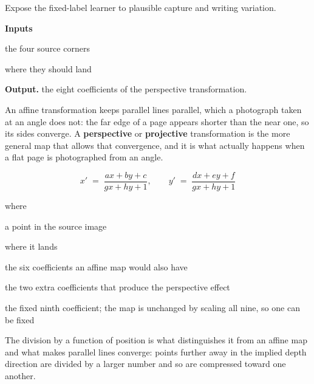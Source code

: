 Expose the fixed-label learner to plausible capture and writing variation.




\noindent\textbf{Inputs}
\begin{description}[leftmargin=2.2em,style=nextline,font=\normalfont\ttfamily]\setlength\itemsep{1pt}
  \item[{startpoints}] \normalfont the four source corners
  \item[{endpoints}] \normalfont where they should land
\end{description}

\noindent\textbf{Output.} the eight coefficients of the perspective transformation.


An affine transformation keeps parallel lines parallel, which a photograph taken at an angle does not: the far edge of a page appears shorter than the near one, so its sides converge. A \textbf{perspective} or \textbf{projective} transformation is the more general map that allows that convergence, and it is what actually happens when a flat page is photographed from an angle.


\begin{equation}
x' \;=\; \frac{a x + b y + c}{g x + h y + 1}, \qquad y' \;=\; \frac{d x + e y + f}{g x + h y + 1}
\end{equation}

\noindent where
\begin{description}[leftmargin=2.4em,style=nextline,font=\normalfont\ttfamily]\setlength\itemsep{1pt}
  \item[{$x,\,y$}] \normalfont a point in the source image
  \item[{$x',\,y'$}] \normalfont where it lands
  \item[{$a \dots f$}] \normalfont the six coefficients an affine map would also have
  \item[{$g,\,h$}] \normalfont the two extra coefficients that produce the perspective effect
  \item[{$1$}] \normalfont the fixed ninth coefficient; the map is unchanged by scaling all nine, so one can be fixed
\end{description}
The division by a function of position is what distinguishes it from an affine map and what makes parallel lines converge: points further away in the implied depth direction are divided by a larger number and so are compressed toward one another.


